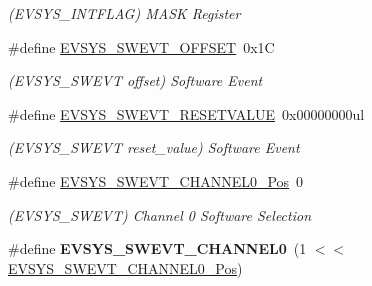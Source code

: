 \begin{DoxyCompactItemize}
\begin{DoxyCompactList}\small\item\em (E\+V\+S\+Y\+S\+\_\+\+I\+N\+T\+F\+L\+A\+G) M\+A\+S\+K Register \end{DoxyCompactList}\item 
\hypertarget{group___s_a_m_l21___e_v_s_y_s_ga167034f50f9b8d02b01907de78ac5af3}{}\#define \hyperlink{group___s_a_m_l21___e_v_s_y_s_ga167034f50f9b8d02b01907de78ac5af3}{E\+V\+S\+Y\+S\+\_\+\+S\+W\+E\+V\+T\+\_\+\+O\+F\+F\+S\+E\+T}~0x1\+C\label{group___s_a_m_l21___e_v_s_y_s_ga167034f50f9b8d02b01907de78ac5af3}

\begin{DoxyCompactList}\small\item\em (E\+V\+S\+Y\+S\+\_\+\+S\+W\+E\+V\+T offset) Software Event \end{DoxyCompactList}\item 
\hypertarget{group___s_a_m_l21___e_v_s_y_s_ga80608cde26d5a1d22be06c196acfaaa2}{}\#define \hyperlink{group___s_a_m_l21___e_v_s_y_s_ga80608cde26d5a1d22be06c196acfaaa2}{E\+V\+S\+Y\+S\+\_\+\+S\+W\+E\+V\+T\+\_\+\+R\+E\+S\+E\+T\+V\+A\+L\+U\+E}~0x00000000ul\label{group___s_a_m_l21___e_v_s_y_s_ga80608cde26d5a1d22be06c196acfaaa2}

\begin{DoxyCompactList}\small\item\em (E\+V\+S\+Y\+S\+\_\+\+S\+W\+E\+V\+T reset\+\_\+value) Software Event \end{DoxyCompactList}\item 
\hypertarget{group___s_a_m_l21___e_v_s_y_s_gaf6d9abc112b697d25dcfde810b1ec6c7}{}\#define \hyperlink{group___s_a_m_l21___e_v_s_y_s_gaf6d9abc112b697d25dcfde810b1ec6c7}{E\+V\+S\+Y\+S\+\_\+\+S\+W\+E\+V\+T\+\_\+\+C\+H\+A\+N\+N\+E\+L0\+\_\+\+Pos}~0\label{group___s_a_m_l21___e_v_s_y_s_gaf6d9abc112b697d25dcfde810b1ec6c7}

\begin{DoxyCompactList}\small\item\em (E\+V\+S\+Y\+S\+\_\+\+S\+W\+E\+V\+T) Channel 0 Software Selection \end{DoxyCompactList}\item 
\hypertarget{group___s_a_m_l21___e_v_s_y_s_ga7388a90575709063c3329b71df4c3b7d}{}\#define {\bfseries E\+V\+S\+Y\+S\+\_\+\+S\+W\+E\+V\+T\+\_\+\+C\+H\+A\+N\+N\+E\+L0}~(1 $<$$<$ \hyperlink{group___s_a_m_l21___e_v_s_y_s_gaf6d9abc112b697d25dcfde810b1ec6c7}{E\+V\+S\+Y\+S\+\_\+\+S\+W\+E\+V\+T\+\_\+\+C\+H\+A\+N\+N\+E\+L0\+\_\+\+Pos})\label{group___s_a_m_l21___e_v_s_y_s_ga7388a90575709063c3329b71df4c3b7d}


\end{DoxyCompactItemize}
